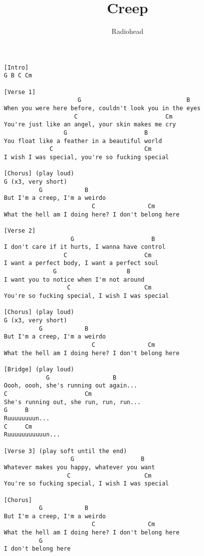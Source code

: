 \documentclass{article}%
\title{Creep}
\date{}
\author{Radiohead}
\begin{document}
\maketitle
\begin{verbatim}
[Intro]
G B C Cm

[Verse 1]
                     G                              B
When you were here before, couldn't look you in the eyes
                    C                         Cm
You're just like an angel, your skin makes me cry
                 G                      B
You float like a feather in a beautiful world
             C                          Cm
I wish I was special, you're so fucking special

[Chorus] (play loud)
G (x3, very short)
          G            B
But I'm a creep, I'm a weirdo
                         C               Cm
What the hell am I doing here? I don't belong here

[Verse 2]
                   G                      B
I don't care if it hurts, I wanna have control
                 C                      Cm
I want a perfect body, I want a perfect soul
              G                    B
I want you to notice when I'm not around
                  C                     Cm
You're so fucking special, I wish I was special

[Chorus] (play loud)
G (x3, very short)
          G            B
But I'm a creep, I'm a weirdo
                         C               Cm
What the hell am I doing here? I don't belong here

[Bridge] (play loud)
            G                  B
Oooh, oooh, she's running out again...
C                      Cm                
She's running out, she run, run, run...
G     B
Ruuuuuuuun...
C     Cm
Ruuuuuuuuuuun...

[Verse 3] (play soft until the end)
                   G                   B
Whatever makes you happy, whatever you want
                  C                     Cm
You're so fucking special, I wish I was special

[Chorus]
          G            B
But I'm a creep, I'm a weirdo
                         C               Cm
What the hell am I doing here? I don't belong here
          G
I don't belong here
\end{verbatim}
\end{document}
